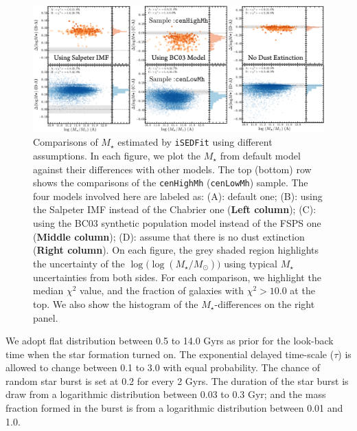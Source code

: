 \documentclass{emulateapj}
\def\rbcg{\texttt{cenHighMh}}
\def\nbcg{\texttt{cenLowMh}}
\def\mstar{{$M_{\star}$}}
\def\logms{{$\log (M_{\star}/M_{\odot})$}}
\begin{document}
\begin{CJK*}{UTF8}{gbsn}
    \begin{figure}[hbt!]
        \begin{center}
        \includegraphics[width=\textwidth]{fig/redbcg_isedfit_3.pdf}
        \caption{Comparisons of \mstar{} estimated by \texttt{iSEDFit} using different
            assumptions. 
            In each figure, we plot the \mstar{} from default model against their 
            differences with other models. 
            The top (bottom) row shows the comparisons of the \rbcg{} (\nbcg{}) sample. 
            The four models involved here are labeled as: 
            (A): default one; 
            (B): using the Salpeter IMF instead of the Chabrier one 
                (\textbf{Left column});
            (C): using the BC03 synthetic population model instead of the FSPS one
                (\textbf{Middle column});
            (D): assume that there is no dust extinction (\textbf{Right column}). 
            On each figure, the grey shaded region highlights the uncertainty 
            of the $\log($\logms{}$)$ using typical \mstar{} uncertainties from 
            both sides. 
            For each comparison, we highlight the median $\chi^{2}$ value, and the fraction
            of galaxies with $\chi^{2} > 10.0$ at the top. 
            We also show the histogram of the \mstar{}-differences on the right panel.}
        \label{fig:ised_3}
        \end{center}
    \end{figure}

    We adopt flat distribution between 0.5 to 14.0 Gyrs as prior for the look-back 
    time when the star formation turned on. 
    The exponential delayed time-scale ($\tau$) is allowed to change between 
    0.1 to 3.0 with equal probability.  
    The chance of random star burst is set at 0.2 for every 2 Gyrs. 
    The duration of the star burst is draw from a logarithmic distribution 
    between 0.03 to 0.3 Gyr; and the mass fraction formed in the burst is from 
    a logarithmic distribution between 0.01 and 1.0.  


\end{CJK*}
\end{document}
